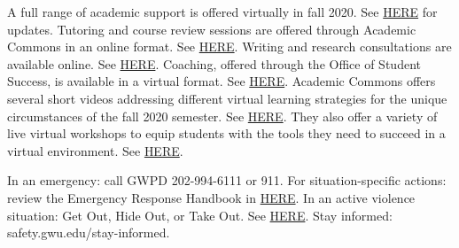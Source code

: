 \documentclass[
  letterpaper,
  DIV=11,
  numbers=noendperiod]{scrreprt}
\begin{document}
\begin{tcolorbox}[enhanced jigsaw, opacityback=0, left=2mm, breakable, bottomtitle=1mm, rightrule=.15mm, colframe=quarto-callout-tip-color-frame, titlerule=0mm, colback=white, opacitybacktitle=0.6, toptitle=1mm, title=\textcolor{quarto-callout-tip-color}{\faLightbulb}\hspace{0.5em}{Virtual Academic Support}, colbacktitle=quarto-callout-tip-color!10!white, bottomrule=.15mm, arc=.35mm, coltitle=black, leftrule=.75mm, toprule=.15mm]

A full range of academic support is offered virtually in fall 2020. See
\href{coronavirus.gwu.edu/top-faqs}{HERE} for updates. Tutoring and
course review sessions are offered through Academic Commons in an online
format. See \href{academiccommons.gwu.edu/tutoring}{HERE}. Writing and
research consultations are available online. See
\href{academiccommons.gwu.edu/writing-research-help}{HERE}. Coaching,
offered through the Office of Student Success, is available in a virtual
format. See
\href{studentsuccess.gwu.edu/academic-program-support}{HERE}. Academic
Commons offers several short videos addressing different virtual
learning strategies for the unique circumstances of the fall 2020
semester. See \href{academiccommons.gwu.edu/study-skills}{HERE}. They
also offer a variety of live virtual workshops to equip students with
the tools they need to succeed in a virtual environment. See
\href{tinyurl.com/gw-virtual-learning}{HERE}.

\end{tcolorbox}

\begin{tcolorbox}[enhanced jigsaw, opacityback=0, left=2mm, breakable, bottomtitle=1mm, rightrule=.15mm, colframe=quarto-callout-warning-color-frame, titlerule=0mm, colback=white, opacitybacktitle=0.6, toptitle=1mm, title=\textcolor{quarto-callout-warning-color}{\faExclamationTriangle}\hspace{0.5em}{Safety and Security}, colbacktitle=quarto-callout-warning-color!10!white, bottomrule=.15mm, arc=.35mm, coltitle=black, leftrule=.75mm, toprule=.15mm]

In an emergency: call GWPD 202-994-6111 or 911. For situation-specific
actions: review the Emergency Response Handbook in
\href{safety.gwu.edu/emergency-response-handbook}{HERE}. In an active
violence situation: Get Out, Hide Out, or Take Out. See
\href{go.gwu.edu/shooterpret}{HERE}. Stay informed:
safety.gwu.edu/stay-informed.

\end{tcolorbox}
\end{document}
